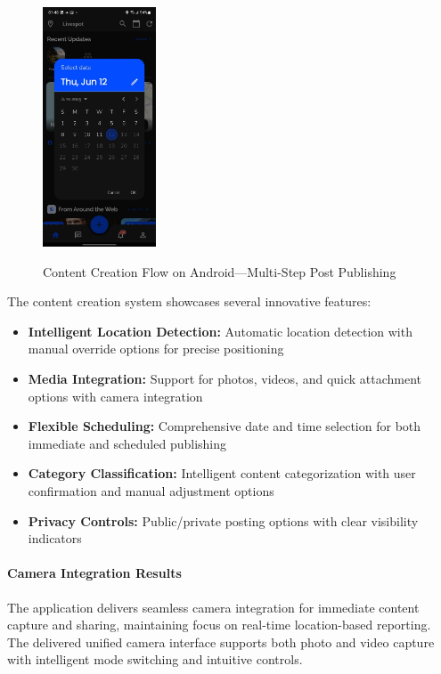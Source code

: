 \begin{figure}[!htbp]
{        \includegraphics[width=0.3\textwidth]{figures/ui/date_picker_homepage_android.jpeg}
    }
    \caption{Content Creation Flow on Android---Multi-Step Post Publishing}\label{fig:android_content_creation}
\end{figure}

The content creation system showcases several innovative features:
\begin{itemize}
    \item \textbf{Intelligent Location Detection:} Automatic location detection with manual override options for precise positioning
    \item \textbf{Media Integration:} Support for photos, videos, and quick attachment options with camera integration
    \item \textbf{Flexible Scheduling:} Comprehensive date and time selection for both immediate and scheduled publishing
    \item \textbf{Category Classification:} Intelligent content categorization with user confirmation and manual adjustment options
    \item \textbf{Privacy Controls:} Public/private posting options with clear visibility indicators
\end{itemize}
\clearpage
\paragraph{Camera Integration Results}
The application delivers seamless camera integration for immediate content capture and sharing, maintaining focus on real-time location-based reporting. The delivered unified camera interface supports both photo and video capture with intelligent mode switching and intuitive controls.

